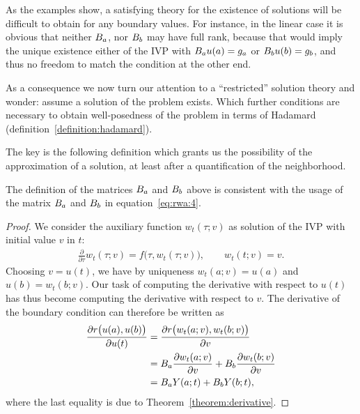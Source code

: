 \begin{remark}
  As the examples show, a satisfying theory for the existence of
  solutions will be difficult to obtain for any boundary values. For
  instance, in the linear case it is obvious that neither $B_a$, nor
  $B_b$ may have full rank, because that would imply the unique
  existence either of the IVP with $B_a u(a) = g_a$ or
  $B_b u(b) = g_b$, and thus no freedom to match the condition at
  the other end.

  As a consequence we now turn our attention to a ``restricted''
  solution theory and wonder: assume a solution of the problem
  exists. Which further conditions are necessary to obtain
  well-posedness of the problem in terms of Hadamard
  (definition~\vref{definition:hadamard}).

  The key is the following definition which grants us the possibility
  of the approximation of a solution, at least after a quantification
  of the neighborhood.
\end{remark}




\begin{remark}
  The definition of the matrices $B_a$ and $B_b$ above is
  consistent with the usage of the matrix $B_a$ and $B_b$ in
  equation~\eqref{eq:rwa:4}.
\end{remark}

\begin{proof}
  We consider the auxiliary function $w_t(\tau;v)$ as solution of the
  IVP with initial value $v$ in $t$:
  \begin{gather*}
    \frac{\partial}{\partial \tau} w_t(\tau;v)
    = f\bigl(\tau,w_t(\tau;v)\bigr), \qquad w_t(t;v) = v.
  \end{gather*}
  Choosing $v=u(t)$, we have by uniqueness $w_t(a;v) = u(a)$ and
  $u(b) = w_t(b;v)$. Our task of computing the derivative with respect
  to $u(t)$ has thus become computing the derivative with respect to
  $v$. The derivative of the boundary condition can therefore be
  written as
  \begin{align*}
    \frac{\partial r\bigl(u(a),u(b)\bigr)}{\partial u(t)}
    &=
    \frac{\partial r\bigl(w_t(a;v),w_t(b;v)\bigr)}{\partial v}
    \\
    &= \rwaa \frac{\partial w_t(a;v)}{\partial v}
    + \rwab \frac{\partial w_t(b;v)}{\partial v}
    \\
    &= \rwaa \fundamental(a;t) + \rwab \fundamental(b;t),
  \end{align*}
  where the last equality is due to Theorem~\ref{theorem:derivative}.
\end{proof}

